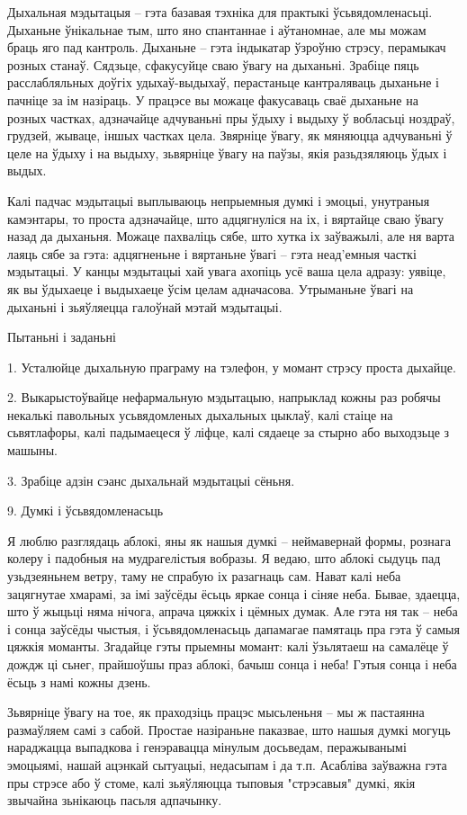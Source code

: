 Дыхальная мэдытацыя – гэта базавая тэхніка для практыкі ўсьвядомленасьці. Дыханьне ўнікальнае тым, што яно спантаннае і аўтаномнае, але мы можам браць яго пад кантроль. Дыханьне – гэта індыкатар ўзроўню стрэсу, перамыкач розных станаў. Сядзьце, сфакусуйце сваю ўвагу на дыханьні. Зрабіце пяць расслабляльных доўгіх удыхаў-выдыхаў, перастаньце кантраляваць дыханьне і пачніце за ім назіраць. У працэсе вы можаце факусаваць сваё дыханьне на розных частках, адзначайце адчуваньні пры ўдыху і выдыху ў вобласьці ноздраў, грудзей, жываце, іншых частках цела. Звярніце ўвагу, як мяняюцца адчуваньні ў целе на ўдыху і на выдыху, зьвярніце ўвагу на паўзы, якія разьдзяляюць ўдых і выдых.

Калі падчас мэдытацыі выплываюць непрыемныя думкі і эмоцыі, унутраныя камэнтары, то проста адзначайце, што адцягнуліся на іх, і вяртайце сваю ўвагу назад да дыханьня. Можаце пахваліць сябе, што хутка іх заўважылі, але ня варта лаяць сябе за гэта: адцягненьне і вяртаньне ўвагі – гэта неад'емныя часткі мэдытацыі. У канцы мэдытацыі хай увага ахопіць усё ваша цела адразу: уявіце, як вы ўдыхаеце і выдыхаеце ўсім целам адначасова. Утрыманьне ўвагі на дыханьні і зьяўляецца галоўнай мэтай мэдытацыі.

Пытаньні і заданьні

1. Усталюйце дыхальную праграму на тэлефон, у момант стрэсу проста дыхайце.

2. Выкарыстоўвайце нефармальную мэдытацыю, напрыклад кожны раз робячы некалькі павольных усьвядомленых дыхальных цыклаў, калі стаіце на сьвятлафоры, калі падымаецеся ў ліфце, калі сядаеце за стырно або выходзьце з машыны.

3. Зрабіце адзін сэанс дыхальнай мэдытацыі сёньня.


9. Думкі і ўсьвядомленасьць

Я люблю разглядаць аблокі, яны як нашыя думкі – неймавернай формы, рознага колеру і падобныя на мудрагелістыя вобразы. Я ведаю, што аблокі сыдуць пад узьдзеяньнем ветру, таму не спрабую іх разагнаць сам. Нават калі неба зацягнутае хмарамі, за імі заўсёды ёсьць яркае сонца і сіняе неба. Бывае, здаецца, што ў жыцьці няма нічога, апрача цяжкіх і цёмных думак. Але гэта ня так – неба і сонца заўсёды чыстыя, і ўсьвядомленасьць дапамагае памятаць пра гэта ў самыя цяжкія моманты. Згадайце гэты прыемны момант: калі ўзьлятаеш на самалёце ў дождж ці сьнег, прайшоўшы праз аблокі, бачыш сонца і неба! Гэтыя сонца і неба ёсьць з намі кожны дзень.

Зьвярніце ўвагу на тое, як праходзіць працэс мысьленьня – мы ж пастаянна размаўляем самі з сабой. Простае назіраньне паказвае, што нашыя думкі могуць нараджацца выпадкова і генэравацца мінулым досьведам, перажыванымі эмоцыямі, нашай ацэнкай сытуацыі, недасыпам і да т.п. Асабліва заўважна гэта пры стрэсе або ў стоме, калі зьяўляюцца тыповыя "стрэсавыя" думкі, якія звычайна зьнікаюць пасьля адпачынку.

